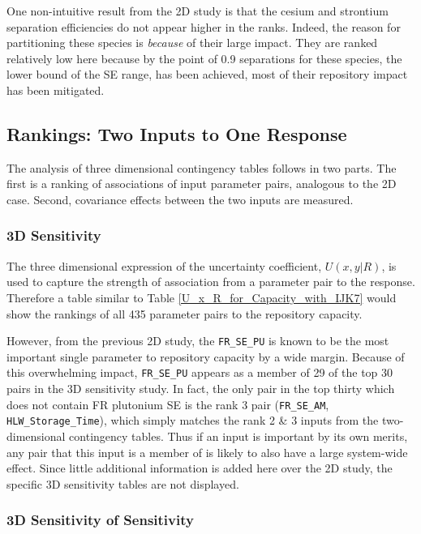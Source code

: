 \documentclass[preprint,12pt]{elsarticle}
\begin{document}
One non-intuitive result from the 2D study is that the cesium and strontium separation efficiencies do not appear higher in the ranks.  Indeed, the reason for
partitioning these species is \emph{because} of their large impact.  They are ranked relatively low here 
because by the point of 0.9 separations for these species,
the lower bound of the SE range, has been achieved, most of their repository impact has been mitigated.

\subsection{Rankings: Two Inputs to One Response}
\label{sec:rank3D}

The analysis of three dimensional contingency tables follows in two parts.  The first is a ranking of associations of input parameter pairs, analogous to
the 2D case.  Second, covariance effects between the two inputs are measured.

\subsubsection{3D Sensitivity}
\label{sec:3D_sensitivity}

%
The three dimensional expression of the uncertainty coefficient, $U(x,y|R)$, is used to capture the strength of association from a parameter pair to the response.
Therefore a table similar to Table \ref{U_x_R_for_Capacity_with_IJK7} would show the rankings of all 435 parameter pairs
to the repository capacity.

However, from the previous 2D study, the \texttt{FR\_SE\_PU}
is known to be the most important single parameter to repository capacity by a wide margin.  Because of this overwhelming impact, \texttt{FR\_SE\_PU} appears as a member of
29 of the top 30 pairs in the 3D sensitivity study.  In fact, the only pair in the top thirty which does not contain FR plutonium SE is the rank 3 pair
(\texttt{FR\_SE\_AM}, \texttt{HLW\_Storage\_Time}), which simply matches the rank 2 \& 3 inputs from the two-dimensional contingency tables.
Thus if an input is important by its own merits, any pair that this input is a member of is likely to also have a large system-wide effect.
Since little additional information is added here over the 2D study, the specific 3D sensitivity tables are not displayed.

\subsubsection{3D Sensitivity of Sensitivity}
\label{sec:3D_sensitivity_of_sensitivity}
\end{document}
